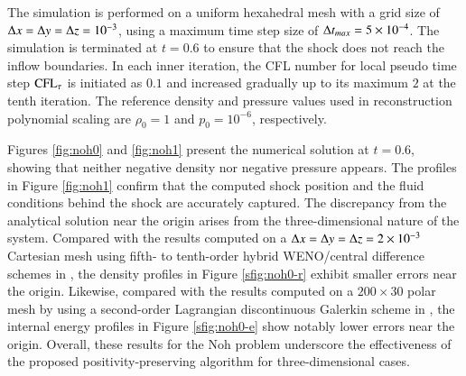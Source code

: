 The simulation is performed on a uniform hexahedral mesh with a grid size of $\mathrm\Delta x = \mathrm\Delta y= \mathrm\Delta z = 10^{-3}$, using a maximum time step size of $\mathrm\Delta t_{max}=5 \times 10^{-4}$. The simulation is terminated at $t=0.6$ to ensure that the 
shock does not reach the inflow boundaries. 
In each inner iteration, the CFL number for local pseudo time step $\text{CFL}_\tau$ is initiated as $0.1$
and increased gradually up to its maximum $2$ at the tenth iteration.
The reference density and pressure values used in reconstruction polynomial scaling are $\rho_0=1$ and $p_0=10^{-6}$, respectively. 

Figures \ref{fig:noh0} and \ref{fig:noh1} present the numerical solution at $t = 0.6$, showing that neither negative density nor negative pressure appears.
The profiles in Figure \ref{fig:noh1} confirm that the computed shock position and the fluid conditions behind the shock are accurately captured. The discrepancy from the analytical solution near the origin arises from the three-dimensional nature of the system.
Compared with the results computed on a $\mathrm\Delta x = \mathrm\Delta y= \mathrm\Delta z = 2 \times 10^{-3}$ Cartesian mesh using fifth- to tenth-order hybrid WENO/central difference schemes in \cite{johnsen2010assessment}, 
the density profiles in Figure \ref{sfig:noh0-r} exhibit smaller errors near the origin.  
Likewise, compared with the results computed on a $200 \times 30$ polar mesh by using a second-order Lagrangian discontinuous Galerkin scheme in \cite{li2014cell},
the internal energy profiles in Figure \ref{sfig:noh0-e} show notably lower errors near the origin.
Overall, these results for the Noh problem underscore the effectiveness of the proposed positivity-preserving algorithm for three-dimensional cases.


